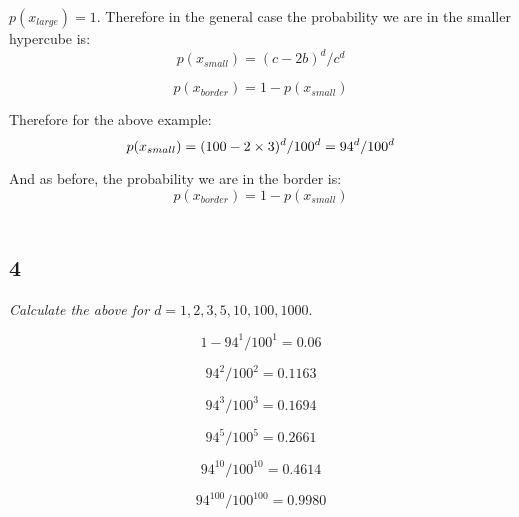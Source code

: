 \documentclass{amsart}
\theoremstyle{definition}
\theoremstyle{remark}
\numberwithin{equation}{section}
\begin{document}
$p(x_{large}) = 1$. Therefore in the general case the probability we are in the smaller hypercube is:\\

\begin{equation}
    p(x_{small}) = (c-2b)^d / c^d
\end{equation}

\begin{equation}
    p(x_{border}) = 1 - p(x_{small})
\end{equation}

Therefore for the above example: \\

\begin{equation}
    p(x_{small}) = (100 - 2 \times 3)^d / 100^d = 94^d / 100^d \\
\end{equation}

And as before, the probability we are in the border is: \\

\begin{equation}
    p(x_{border}) = 1 - p(x_{small})
\end{equation} \\

\subsection{4} 

\textit{Calculate the above for $d = {1, 2, 3, 5, 10, 100, 1000}$}.

\begin{equation}
    1- 94^1 / 100^1 = 0.06
\end{equation}

\begin{equation}
    94^2 / 100^2 = 0.1163
\end{equation}

\begin{equation}
    94^3 / 100^3 = 0.1694
\end{equation}

\begin{equation}
    94^5 / 100^5 = 0.2661
\end{equation}

\begin{equation}
    94^{10} / 100^{10} = 0.4614
\end{equation}

\begin{equation}
    94^{100} / 100^{100} = 0.9980
\end{equation}
\end{document}
